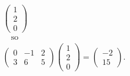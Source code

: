 {\begin{gather*}
\begin{pmatrix} 1 \\ 2 \\ 0 \end{pmatrix} 
%
\\ \quad\text{so}\quad \\
%
\begin{pmatrix}
0 & -1 & 2 \\
3 &  6 & 5
\end{pmatrix}
\begin{pmatrix}
1 \\ 2 \\  0
\end{pmatrix}
=
\begin{pmatrix}
-2 \\ 15
\end{pmatrix}.
\end{gather*}
}


